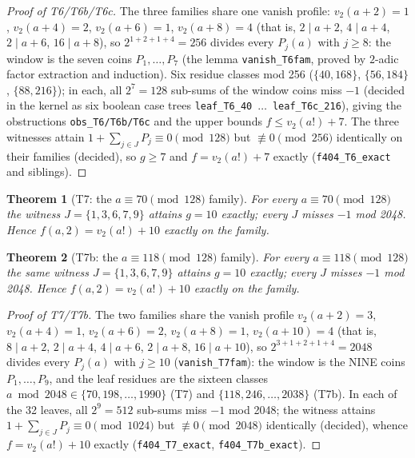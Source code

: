 \documentclass[11pt]{article}
\newtheorem{theorem}{Theorem}
\newcommand{\vtwo}{v_2}
\begin{document}
\begin{proof}[Proof of T6/T6b/T6c]
The three families share one vanish profile:
$\vtwo(a+2) = 1$, $\vtwo(a+4) = 2$, $\vtwo(a+6) = 1$, $\vtwo(a+8) = 4$
(that is, $2 \mid a+2$, $4 \mid a+4$, $2 \mid a+6$, $16 \mid a+8$), so
$2^{1+2+1+4} = 256$ divides every $P_j(a)$ with $j \ge 8$: the window is
the seven coins $P_1, \dots, P_7$ (the lemma \texttt{vanish\_T6fam}, proved
by $2$-adic factor extraction and induction). Six residue classes mod 256
($\{40, 168\}$, $\{56, 184\}$, $\{88, 216\}$); in each, all $2^7 = 128$
sub-sums of the window coins miss $-1$ (decided in the kernel as six
boolean case trees \texttt{leaf\_T6\_40}~$\dots$~\texttt{leaf\_T6c\_216}),
giving the obstructions \texttt{obs\_T6/T6b/T6c} and the upper bounds
$f \le \vtwo(a!) + 7$. The three witnesses attain
$1 + \sum_{j \in J} P_j \equiv 0 \pmod{128}$ but $\not\equiv 0
\pmod{256}$ identically on their families (decided), so $g \ge 7$ and
$f = \vtwo(a!) + 7$ exactly (\texttt{f404\_T6\_exact} and siblings).
\end{proof}

\begin{theorem}[T7: the $a \equiv 70 \pmod{128}$ family]
For every $a \equiv 70 \pmod{128}$ the witness $J = \{1,3,6,7,9\}$ attains
$g = 10$ exactly; every $J$ misses $-1$ mod 2048. Hence
$f(a,2) = \vtwo(a!) + 10$ exactly on the family.
\end{theorem}

\begin{theorem}[T7b: the $a \equiv 118 \pmod{128}$ family]
For every $a \equiv 118 \pmod{128}$ the same witness $J = \{1,3,6,7,9\}$
attains $g = 10$ exactly; every $J$ misses $-1$ mod 2048. Hence
$f(a,2) = \vtwo(a!) + 10$ exactly on the family.
\end{theorem}

\begin{proof}[Proof of T7/T7b]
The two families share the vanish profile
$\vtwo(a+2) = 3$, $\vtwo(a+4) = 1$, $\vtwo(a+6) = 2$, $\vtwo(a+8) = 1$,
$\vtwo(a+10) = 4$ (that is, $8 \mid a+2$, $2 \mid a+4$, $4 \mid a+6$,
$2 \mid a+8$, $16 \mid a+10$), so $2^{3+1+2+1+4} = 2048$ divides every
$P_j(a)$ with $j \ge 10$ (\texttt{vanish\_T7fam}): the window is the NINE
coins $P_1, \dots, P_9$, and the leaf residues are the sixteen classes
$a \bmod 2048 \in \{70, 198, \dots, 1990\}$ (T7) and
$\{118, 246, \dots, 2038\}$ (T7b). In each of the 32 leaves, all
$2^9 = 512$ sub-sums miss $-1$ mod 2048; the witness attains
$1 + \sum_{j \in J} P_j \equiv 0 \pmod{1024}$ but $\not\equiv 0
\pmod{2048}$ identically (decided), whence
$f = \vtwo(a!) + 10$ exactly (\texttt{f404\_T7\_exact}, \texttt{f404\_T7b\_exact}).
\end{proof}
\end{document}

